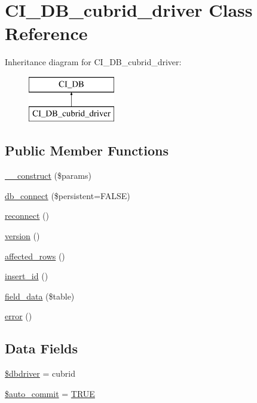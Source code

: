 \hypertarget{class_c_i___d_b__cubrid__driver}{}\section{C\+I\+\_\+\+D\+B\+\_\+cubrid\+\_\+driver Class Reference}
\label{class_c_i___d_b__cubrid__driver}
Inheritance diagram for C\+I\+\_\+\+D\+B\+\_\+cubrid\+\_\+driver\+:\begin{figure}[H]
\begin{center}
\leavevmode
\includegraphics[height=2.000000cm]{class_c_i___d_b__cubrid__driver}
\end{center}
\end{figure}
\subsection*{Public Member Functions}
\begin{DoxyCompactItemize}
\item 
\mbox{\hyperlink{class_c_i___d_b__cubrid__driver_a9162320adff1a1a4afd7f2372f753a3e}{\+\_\+\+\_\+construct}} (\$params)
\item 
\mbox{\hyperlink{class_c_i___d_b__cubrid__driver_a52bf595e79e96cc0a7c907a9b45aeb4d}{db\+\_\+connect}} (\$persistent=F\+A\+L\+SE)
\item 
\mbox{\hyperlink{class_c_i___d_b__cubrid__driver_a57c19c642ab3023e28d10c50f86ff0a8}{reconnect}} ()
\item 
\mbox{\hyperlink{class_c_i___d_b__cubrid__driver_a6080dae0886626b9a4cedb29240708b1}{version}} ()
\item 
\mbox{\hyperlink{class_c_i___d_b__cubrid__driver_a77248aaad33eb132c04cc4aa3f4bc8cb}{affected\+\_\+rows}} ()
\item 
\mbox{\hyperlink{class_c_i___d_b__cubrid__driver_a933f2cde8dc7f87875e257d0a4902e99}{insert\+\_\+id}} ()
\item 
\mbox{\hyperlink{class_c_i___d_b__cubrid__driver_a90355121e1ed009e0efdbd544ab56efa}{field\+\_\+data}} (\$table)
\item 
\mbox{\hyperlink{class_c_i___d_b__cubrid__driver_a43b8d30b879d4f09ceb059b02af2bc02}{error}} ()
\end{DoxyCompactItemize}
\subsection*{Data Fields}
\begin{DoxyCompactItemize}
\item 
\mbox{\hyperlink{class_c_i___d_b__cubrid__driver_a0cde2a16322a023d040aa7f725877597}{\$dbdriver}} = \textquotesingle{}cubrid\textquotesingle{}
\item 
\mbox{\hyperlink{class_c_i___d_b__cubrid__driver_a2620b91fdfd73aa770c443ad172f1914}{\$auto\+\_\+commit}} = \mbox{\hyperlink{constants_8php_ae04a3efe6aa42044f803ee90c2277846}{T\+R\+UE}}
\end{DoxyCompactItemize}

